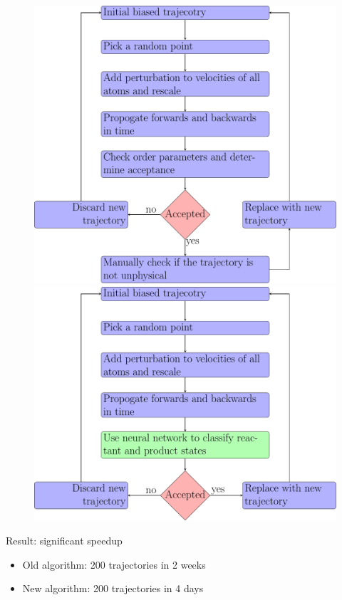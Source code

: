 \documentclass{beamer}
\begin{document}
\begin{frame}
\begin{center}
\begin{figure}
\centering
\begin{overprint}
    \includegraphics[scale=0.3]{flow/old-flow.pdf}
    \includegraphics[scale=0.3]{flow/flowchart.pdf}
\end{overprint}
\end{figure}
\end{center}
\pause
\begin{block}{Result: significant speedup}
\begin{itemize}
    \item Old algorithm: 200 trajectories in 2 weeks
    \item New algorithm: 200 trajectories in 4 days
\end{itemize}
\end{block}
\end{frame}
\end{document}
